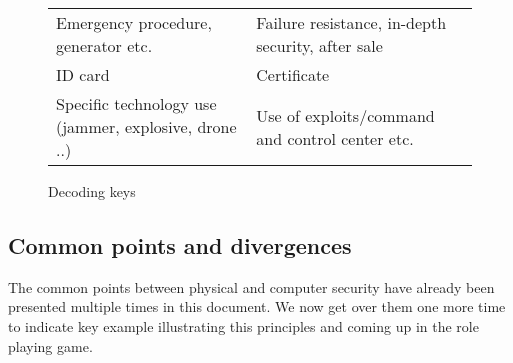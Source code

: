 \documentclass[11pt]{article} %
\begin{document}
\begin{figure}
\begin{tabularx}{\textwidth}{|X|X|}
Emergency procedure, generator etc. & Failure resistance, in-depth security, after sale \\
ID card & Certificate \\
Specific technology use (jammer, explosive, drone ..) &
Use of exploits/command and control center etc. \\ \hline
    \end{tabularx}
    \caption{Decoding keys}
\end{figure}

%
\subsection{Common points and divergences}
The common points between physical and computer security have already 
been presented multiple times in this document. We now get over them one 
more time to indicate key example illustrating this principles and coming up 
in the role playing game.

\end{document}

